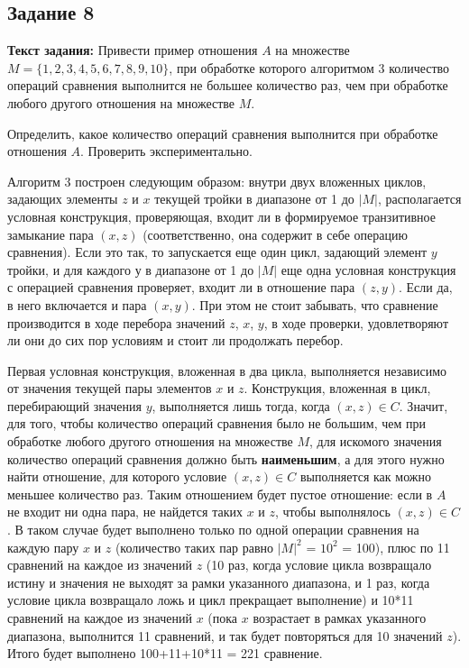 \documentclass[12pt]{article}
\begin{document}
	\subsection{Задание 8}
	\label{task8}
	{\bf Текст задания:} Привести пример отношения $A$ на множестве $M = \{1, 2, 3, 4, 5, 6, 7, 8, 9, 10\}$, при обработке которого алгоритмом 3 количество операций сравнения выполнится не большее количество раз, чем при обработке любого другого отношения на множестве $M$.
	
	Определить, какое количество операций сравнения выполнится при обработке отношения $A$. Проверить экспериментально.
	
	Алгоритм 3 построен следующим образом: внутри двух вложенных циклов, задающих элементы $z$ и $x$ текущей тройки в диапазоне от 1 до $|M|$, располагается условная конструкция, проверяющая, входит ли в формируемое транзитивное замыкание пара $(x, z)$ (соответственно, она содержит в себе операцию сравнения). Если это так, то запускается еще один цикл, задающий элемент $y$ тройки, и для каждого у в диапазоне от 1 до $|M|$ еще одна условная конструкция с операцией сравнения проверяет, входит ли в отношение пара $(z, y)$. Если да, в него включается и пара $(x, y)$. При этом не стоит забывать, что сравнение производится в ходе перебора значений $z$, $x$, $y$, в ходе проверки, удовлетворяют ли они до сих пор условиям и стоит ли продолжать перебор.
	
	Первая условная конструкция, вложенная в два цикла, выполняется независимо от значения текущей пары элементов $x$ и $z$. Конструкция, вложенная в цикл, перебирающий значения $y$, выполняется лишь тогда, когда $(x, z) \in C$. Значит, для того, чтобы количество операций сравнения было не большим, чем при обработке любого другого отношения на множестве $M$, для искомого значения количество операций сравнения должно быть {\bf наименьшим}, а для этого нужно найти отношение, для которого условие $(x, z) \in C$ выполняется как можно меньшее количество раз. Таким отношением будет пустое отношение: если в $A$ не входит ни одна пара, не найдется таких $x$ и $z$, чтобы выполнялось $(x, z) \in C$. В таком случае будет выполнено только по одной операции сравнения на каждую пару $x$ и $z$ (количество таких пар равно $|M|^2$ = $10^2$ = 100), плюс по 11 сравнений на каждое из значений $z$ (10 раз, когда условие цикла возвращало истину и значения не выходят за рамки указанного диапазона, и 1 раз, когда условие цикла возвращало ложь и цикл прекращает выполнение) и 10*11 сравнений на каждое из значений $x$ (пока $x$ возрастает в рамках указанного диапазона, выполнится 11 сравнений, и так будет повторяться для 10 значений $z$). Итого будет выполнено 100+11+10*11 = 221 сравнение.
	
\end{document}
